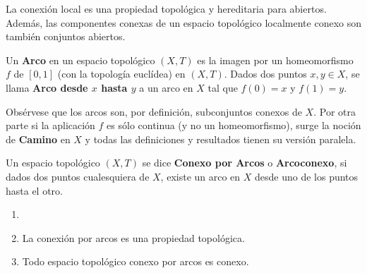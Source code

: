 \documentclass[cursovd_portada.tex]{subfiles}
\begin{document}
\begin{prop}
La conexión local es una propiedad topológica y hereditaria para abiertos. Además, las componentes conexas de un
espacio topológico localmente conexo son también conjuntos abiertos.
\end{prop}
\begin{defi}
Un {\bf Arco} en un espacio topológico $(X,T)$ es la imagen por un homeomorfismo $f$ de $[0,1]$ (con la topología
euclídea) en $(X,T)$. Dados dos puntos $x,y\in X$, se llama {\bf Arco desde $x$ hasta $y$} a un arco en $X$ tal
que $f(0)=x$ y $f(1)=y$.
\end{defi}
\begin{nota}
{\rm Obsérvese que los arcos son, por definición, subconjuntos conexos de $X$. Por otra parte si la aplicación $f$
es sólo continua (y no un homeomorfismo), surge la noción de {\bf Camino} en $X$ y todas las definiciones y
resultados tienen su versión paralela.}
\end{nota}
\begin{defi}
Un espacio topológico $(X,T)$ se dice {\bf Conexo por Arcos} o {\bf Arcoconexo}, si dados dos puntos cualesquiera
de $X$, existe un arco en $X$ desde uno de los puntos hasta el otro.
\end{defi}
\begin{prop}
\begin{enumerate}
\item[]
\item La conexión por arcos es una propiedad topológica.
\item Todo espacio topológico conexo por arcos es conexo.
\end{enumerate}
\end{prop}
\end{document}
